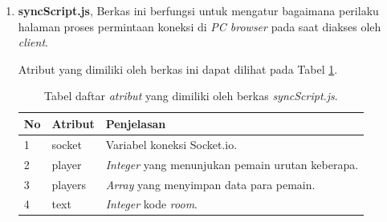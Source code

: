 \begin{enumerate}
\begin{enumerate}
\begin{enumerate}
			\item \textbf{syncScript.js}, Berkas ini berfungsi untuk mengatur bagaimana perilaku halaman proses permintaan koneksi di \textit{PC browser} pada saat diakses oleh \textit{client}.
			
			Atribut yang dimiliki oleh berkas ini dapat dilihat pada Tabel \ref{table:atribut_syncScript}.
			\begin{table}[H]
				\centering
				\caption{Tabel daftar \textit{atribut} yang dimiliki oleh berkas \textit{syncScript.js}.}
				\begin{tabular}{|p{0.35cm}|p{3cm}|p{7cm}|}
					\hline
					No & Atribut & Penjelasan \\ \hline
					1 & socket & Variabel koneksi Socket.io. \\ \hline
					2 & player & \textit{Integer} yang menunjukan pemain urutan keberapa. \\ \hline
					3 & players & \textit{Array} yang menyimpan data para pemain. \\ \hline
					4 & text & \textit{Integer} kode \textit{room}.  \\ \hline
				\end{tabular}
				\label{table:atribut_syncScript}
			\end{table}
			

\end{enumerate}
\end{enumerate}
\end{enumerate}

